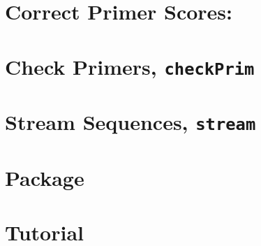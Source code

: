 \documentclass[a4paper]{report}
\begin{document}
\chapter{Correct Primer Scores: }

\chapter{Check Primers, \texttt{checkPrim}}

\chapter{Stream Sequences, \texttt{stream}}

\chapter{Package }

\chapter{Tutorial}\label{ch:tut}



\end{document}

